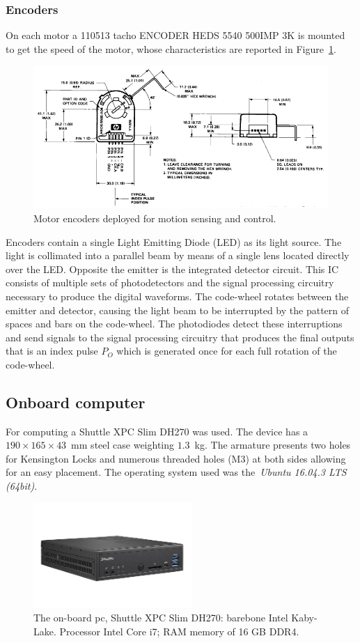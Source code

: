 \subsubsection{Encoders}
On each motor a 110513 tacho ENCODER HEDS 5540 500IMP 3K is mounted to get the speed of the motor, whose characteristics are reported in Figure~\ref{enc}.
\begin{figure}[htbp]
	\centering
	\includegraphics[width=\textwidth]{images/03-foundation/enc}
	\caption{Motor encoders deployed for motion sensing and control.}
	\label{enc} 
\end{figure}
Encoders contain a single Light Emitting Diode (LED) as its light source. The light is collimated into a parallel beam by means of a single lens located directly over the LED. Opposite the emitter is the integrated detector circuit. This IC consists of multiple sets of photodetectors and the signal processing circuitry necessary to produce the digital waveforms. The code-wheel rotates between the emitter and detector, causing the light beam to be interrupted by the pattern of spaces and bars on the code-wheel. The photodiodes detect these interruptions and send signals to the signal processing circuitry that produces the final outputs that is an index pulse $P_O$ which is generated once for each full rotation of the code-wheel.

\subsection{Onboard computer}
\label{onboard pc}
For computing a Shuttle XPC Slim DH270 was used. The device has a $190 \times 165 \times 43$~mm steel case weighting $1.3$~kg.  The armature presents two holes for Kensington Locks and numerous threaded holes (M3) at both sides allowing for an easy placement. The operating system used was the~\textit{Ubuntu 16.04.3 LTS (64bit)}.

\begin{figure}[H]
	\centering
	\includegraphics[width=6cm]{images/03-foundation/onboardpc}
	\caption{The on-board pc, Shuttle XPC Slim DH270: barebone Intel Kaby-Lake. Processor Intel Core i7; RAM memory of 16 GB DDR4.}
	\label{onboardpc}
\end{figure}

